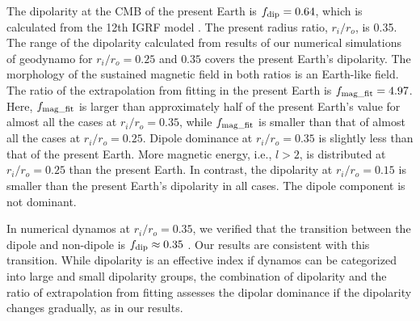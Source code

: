 The dipolarity at the CMB of the present Earth is $f_{\rm dip} = 0.64$, which is calculated from the 12th IGRF model \cite{Thebault:2015}. 
The present radius ratio, $r_i/r_o$, is 0.35. 
The range of the dipolarity calculated from results of our numerical simulations of geodynamo for $r_i/r_o  = 0.25$ and $0.35$ covers the present Earth's dipolarity. 
The morphology of the sustained magnetic field in both ratios is an Earth-like field. 
The ratio of the extrapolation from fitting in the present Earth is $f_{\rm mag\_fit} = 4.97$. 
Here, $f_{\rm mag\_fit}$ is larger than approximately half of the present Earth's value for almost all the cases at $r_i/r_o = 0.35$, while $f_{\rm mag\_fit}$ is smaller than that of almost all the cases at $r_i/r_o = 0.25$. 
Dipole dominance at $r_i/r_o = 0.35$ is slightly less than that of the present Earth. 
More magnetic energy, i.e., $l > 2$, is distributed at $r_i/r_o = 0.25$ than the present Earth. 
In contrast, the dipolarity at $r_i/r_o = 0.15$ is smaller than the present Earth's dipolarity in all cases. 
The dipole component is not dominant.

In numerical dynamos at $r_i/r_o = 0.35$, we verified that the transition between the dipole and non-dipole is $f_{\rm dip} \approx 0.35$ \cite{Uli:2006,Olson:2011}.
Our results are consistent with this transition. 
While dipolarity is an effective index if dynamos can be categorized into large and small dipolarity groups, the combination of dipolarity and the ratio of extrapolation from fitting assesses the dipolar dominance if the dipolarity changes gradually, as in our results.

